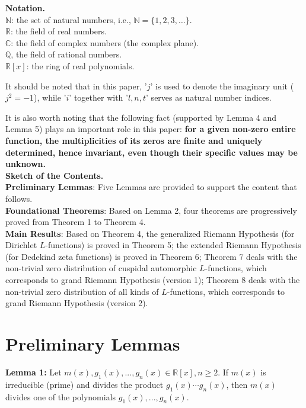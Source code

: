 \documentclass[12pt]{article}
\begin{document}
\textbf{Notation.}\\

\noindent $\mathbb{N}$: the set of natural numbers, i.e., $\mathbb{N}=\{1, 2, 3, \ldots\}$.\\
$\mathbb{R}$: the field of real numbers.\\
$\mathbb{C}$: the field of complex numbers (the complex plane).\\
$\mathbb{Q}$, the field of rational numbers.\\
$\mathbb{R}[x]$: the ring of real polynomials.

It should be noted that in this paper, '$j$' is used to denote the imaginary unit ($j^2=-1$), while '$i$' together with '$l, n, t$' serves as natural number indices.

It is also worth noting that the following fact (supported by Lemma 4 and Lemma 5) plays an important role in this paper: \textbf{for a given non-zero entire function, the multiplicities of its zeros are finite and uniquely determined, hence invariant, even though their specific values may be unknown.}\\

\textbf{Sketch of the Contents.}\\

\noindent\textbf{Preliminary Lemmas}: Five Lemmas are provided to support the content that follows.\\
\textbf{Foundational Theorems}: Based on Lemma 2, four theorems are progressively proved from Theorem 1 to Theorem 4.\\
\textbf{Main Results}: Based on Theorem 4, the generalized Riemann Hypothesis (for Dirichlet $L$-functions) is proved in Theorem 5; the extended Riemann Hypothesis (for Dedekind zeta functions) is proved in Theorem 6; Theorem 7 deals with the non-trivial zero distribution of cuspidal automorphic $L$-functions, which corresponds to grand Riemann Hypothesis (version 1); Theorem 8 deals with the non-trivial zero distribution of all kinds of $L$-functions, which corresponds to grand Riemann Hypothesis (version 2).


\section{Preliminary Lemmas}

\textbf{Lemma 1:} Let  $m(x), g_1(x), . . ., g_n(x) \in \mathbb{R}[x], n\geq 2$. If $m(x)$ is irreducible (prime) and divides the product $g_1(x) \cdots g_n(x)$, then $m(x)$ divides one of the polynomials $g_1(x), . . . , g_n(x)$.
\end{document}
